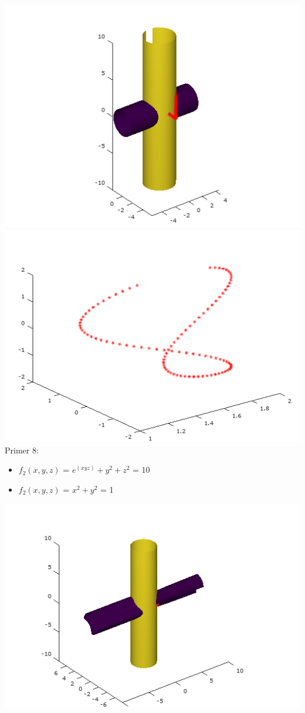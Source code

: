 \documentclass[]{article}
\begin{document}
	\includegraphics[scale=0.5]{primer7_3}
	\includegraphics[scale=0.5]{primer7_4} 
	\\
	Primer 8:
	\begin{itemize}  
		\item $f_{2}(x,y,z)$ = $e^{(xyz)}+y^{2}+z^{2}$ = 10
		\item $f_{2}(x,y,z)$ =  $x^2 + y^2$ = 1
	\end{itemize}
	\includegraphics[scale=0.5]{primer8_1}
\end{document}
